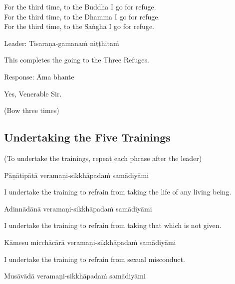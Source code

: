 \begin{english-verses}
  For the third time, to the Buddha I go for refuge.\\
  For the third time, to the Dhamma I go for refuge.\\
  For the third time, to the Saṅgha I go for refuge.
\end{english-verses}

Leader: Tisaraṇa-gamanaṁ niṭṭhitaṁ

\begin{english}
\hspace{1.4cm} This completes the going to the Three Refuges.
\end{english}

Response: Āma bhante

\begin{english}
\hspace{1.4cm} Yes, Venerable Sir.
\end{english}

(Bow three times)

\subsection{Undertaking the Five Trainings}

  (To undertake the trainings, repeat each phrase after the leader)

Pāṇātipātā veramaṇi-sikkhāpadaṁ samādiyāmi

\begin{english-hang}
  I undertake the training\hyperlink{endnote136-appendix}{\hypertarget{endnote136-body}{}}
  to refrain from taking the life of any living being.
\end{english-hang}

Adinnādānā veramaṇi-sikkhāpadaṁ samādiyāmi

\begin{english}
  I undertake the training to refrain from taking that which is not given.
\end{english}

Kāmesu micchācārā veramaṇi-sikkhāpadaṁ samādiyāmi

\begin{english}
  I undertake the training to refrain from sexual misconduct.
\end{english}

Musāvādā veramaṇi-sikkhāpadaṁ samādiyāmi

